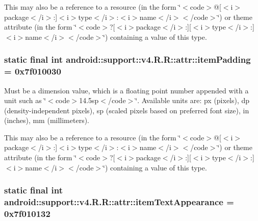 This may also be a reference to a resource (in the form \char`\"{}$<$code$>$@\mbox{[}$<$i$>$package$<$/i$>$:\mbox{]}$<$i$>$type$<$/i$>$:$<$i$>$name$<$/i$>$$<$/code$>$\char`\"{}) or theme attribute (in the form \char`\"{}$<$code$>$?\mbox{[}$<$i$>$package$<$/i$>$:\mbox{]}\mbox{[}$<$i$>$type$<$/i$>$:\mbox{]}$<$i$>$name$<$/i$>$$<$/code$>$\char`\"{}) containing a value of this type. \hypertarget{classandroid_1_1support_1_1v4_1_1_r_1_1attr_13769149d2e21783b5db7cc455fd1448}{
\subsubsection[{itemPadding}]{\setlength{\rightskip}{0pt plus 5cm}static final int android::support::v4.R.R::attr::itemPadding = 0x7f010030}}
\label{classandroid_1_1support_1_1v4_1_1_r_1_1attr_13769149d2e21783b5db7cc455fd1448}


Must be a dimension value, which is a floating point number appended with a unit such as \char`\"{}$<$code$>$14.5sp$<$/code$>$\char`\"{}. Available units are: px (pixels), dp (density-independent pixels), sp (scaled pixels based on preferred font size), in (inches), mm (millimeters). 

This may also be a reference to a resource (in the form \char`\"{}$<$code$>$@\mbox{[}$<$i$>$package$<$/i$>$:\mbox{]}$<$i$>$type$<$/i$>$:$<$i$>$name$<$/i$>$$<$/code$>$\char`\"{}) or theme attribute (in the form \char`\"{}$<$code$>$?\mbox{[}$<$i$>$package$<$/i$>$:\mbox{]}\mbox{[}$<$i$>$type$<$/i$>$:\mbox{]}$<$i$>$name$<$/i$>$$<$/code$>$\char`\"{}) containing a value of this type. \hypertarget{classandroid_1_1support_1_1v4_1_1_r_1_1attr_185b83793cd7f4bf0ffcd5de92c0ea36}{
\subsubsection[{itemTextAppearance}]{\setlength{\rightskip}{0pt plus 5cm}static final int android::support::v4.R.R::attr::itemTextAppearance = 0x7f010132}}
\label{classandroid_1_1support_1_1v4_1_1_r_1_1attr_185b83793cd7f4bf0ffcd5de92c0ea36}


